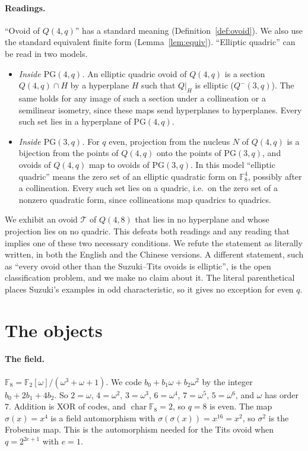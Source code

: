 \documentclass[11pt]{article}
\theoremstyle{definition}
\theoremstyle{remark}
\newcommand{\F}{\mathbb{F}_8}
\begin{document}
\paragraph{Readings.}
``Ovoid of $Q(4,q)$'' has a standard meaning (Definition~\ref{def:ovoid}). We
also use the standard equivalent finite form (Lemma~\ref{lem:equiv}).
``Elliptic quadric'' can be read in two models.
\begin{itemize}
\item[(R1)] \emph{Inside $\mathrm{PG}(4,q)$.} An elliptic quadric ovoid of
$Q(4,q)$ is a section $Q(4,q)\cap H$ by a hyperplane $H$ such that $Q|_H$ is
elliptic ($Q^-(3,q)$). The same holds for any image of such a section under a
collineation or a semilinear isometry, since these maps send hyperplanes to
hyperplanes. Every such set lies in a hyperplane of $\mathrm{PG}(4,q)$.
\item[(R2)] \emph{Inside $\mathrm{PG}(3,q)$.} For $q$ even, projection from the
nucleus $N$ of $Q(4,q)$ is a bijection from the points of $Q(4,q)$ onto the
points of $\mathrm{PG}(3,q)$, and ovoids of $Q(4,q)$ map to ovoids of
$\mathrm{PG}(3,q)$. In this model ``elliptic quadric'' means the zero set of an
elliptic quadratic form on $\F^4$, possibly after a collineation. Every such
set lies on a quadric, i.e.\ on the zero set of a nonzero quadratic form,
since collineations map quadrics to quadrics.
\end{itemize}
We exhibit an ovoid $\mathcal{T}$ of $Q(4,8)$ that lies in no hyperplane and
whose projection lies on no quadric. This defeats both readings and any reading
that implies one of these two necessary conditions.
We refute the statement as literally written, in both the English and the
Chinese versions. A different statement, such as ``every ovoid other than the
Suzuki--Tits ovoids is elliptic'', is the open classification problem, and we
make no claim about it. The literal parenthetical places Suzuki's examples in
odd characteristic, so it gives no exception for even $q$.

\section{The objects}
\paragraph{The field.}
$\F=\mathbb{F}_2[\omega]/(\omega^3+\omega+1)$. We code $b_0+b_1\omega+b_2\omega^2$
by the integer $b_0+2b_1+4b_2$. So $2=\omega$, $4=\omega^2$,
$3=\omega^3$, $6=\omega^4$, $7=\omega^5$, $5=\omega^6$, and $\omega$ has
order $7$. Addition is XOR of codes, and $\operatorname{char}\F=2$, so $q=8$ is
even. The map $\sigma(x)=x^4$ is a field automorphism with
$\sigma(\sigma(x))=x^{16}=x^2$, so $\sigma^2$ is the Frobenius map. This is the
automorphism needed for the Tits ovoid when $q=2^{2e+1}$ with $e=1$.
\end{document}
